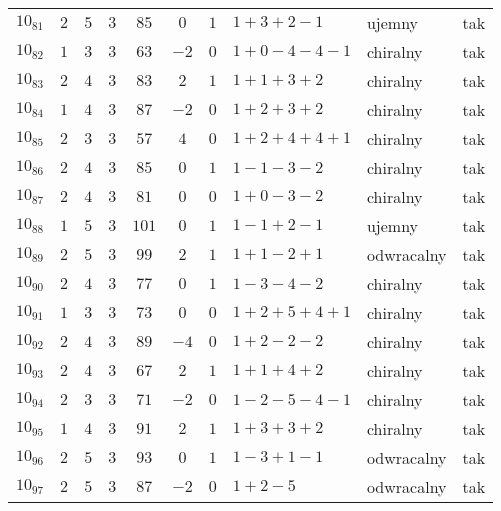 \begin{longtable}{lccccccllc}
$10_{81}$   &  $2$     &  $5$  &  $3$      &  $85$   &  $0$   &  $1$  &  $1+3+2-1$      &  ujemny      &  tak  \\
$10_{82}$   &  $1$     &  $3$  &  $3$      &  $63$   &  $-2$  &  $0$  &  $1+0-4-4-1$    &  chiralny    &  tak  \\
$10_{83}$   &  $2$     &  $4$  &  $3$      &  $83$   &  $2$   &  $1$  &  $1+1+3+2$      &  chiralny    &  tak  \\
$10_{84}$   &  $1$     &  $4$  &  $3$      &  $87$   &  $-2$  &  $0$  &  $1+2+3+2$      &  chiralny    &  tak  \\
$10_{85}$   &  $2$     &  $3$  &  $3$      &  $57$   &  $4$   &  $0$  &  $1+2+4+4+1$    &  chiralny    &  tak  \\
$10_{86}$   &  $2$     &  $4$  &  $3$      &  $85$   &  $0$   &  $1$  &  $1-1-3-2$      &  chiralny    &  tak  \\
$10_{87}$   &  $2$     &  $4$  &  $3$      &  $81$   &  $0$   &  $0$  &  $1+0-3-2$      &  chiralny    &  tak  \\
$10_{88}$   &  $1$     &  $5$  &  $3$      &  $101$  &  $0$   &  $1$  &  $1-1+2-1$      &  ujemny      &  tak  \\
$10_{89}$   &  $2$     &  $5$  &  $3$      &  $99$   &  $2$   &  $1$  &  $1+1-2+1$      &  odwracalny  &  tak  \\
$10_{90}$   &  $2$     &  $4$  &  $3$      &  $77$   &  $0$   &  $1$  &  $1-3-4-2$      &  chiralny    &  tak  \\
$10_{91}$   &  $1$     &  $3$  &  $3$      &  $73$   &  $0$   &  $0$  &  $1+2+5+4+1$    &  chiralny    &  tak  \\
$10_{92}$   &  $2$     &  $4$  &  $3$      &  $89$   &  $-4$  &  $0$  &  $1+2-2-2$      &  chiralny    &  tak  \\
$10_{93}$   &  $2$     &  $4$  &  $3$      &  $67$   &  $2$   &  $1$  &  $1+1+4+2$      &  chiralny    &  tak  \\
$10_{94}$   &  $2$     &  $3$  &  $3$      &  $71$   &  $-2$  &  $0$  &  $1-2-5-4-1$    &  chiralny    &  tak  \\
$10_{95}$   &  $1$     &  $4$  &  $3$      &  $91$   &  $2$   &  $1$  &  $1+3+3+2$      &  chiralny    &  tak  \\
$10_{96}$   &  $2$     &  $5$  &  $3$      &  $93$   &  $0$   &  $1$  &  $1-3+1-1$      &  odwracalny  &  tak  \\
$10_{97}$   &  $2$     &  $5$  &  $3$      &  $87$   &  $-2$  &  $0$  &  $1+2-5$        &  odwracalny  &  tak  \\

\end{longtable}
